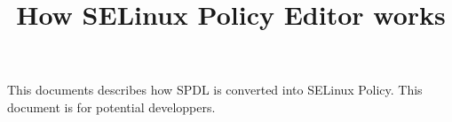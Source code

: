 \documentclass{article}
\title{How SELinux Policy Editor works}
\begin{document}
\def\labelenumi{(\theenumi)}
\maketitle
\tableofcontents
\newpage
This documents describes how SPDL is converted into SELinux Policy.
This document is for potential developpers.
\end{document}
